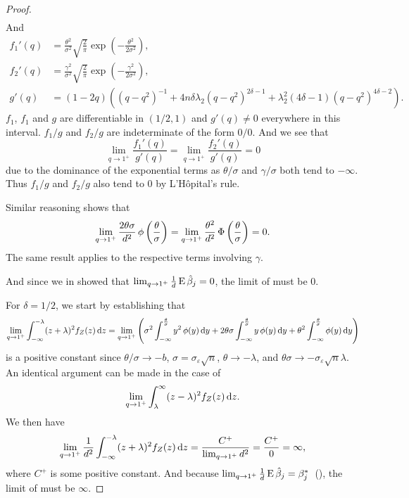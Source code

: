 \begin{proof}
\[\begin{aligned}
    \end{aligned}
  \]
  And
  \begin{align*}
    f_1'(q) & = \frac{\theta^2}{\sigma^2}\sqrt{\frac{2}{\pi}}\exp\left(-\frac{\theta^2}{2\sigma^2}\right),                                    \\
    f_2'(q) & = \frac{\gamma^2}{\sigma^2}\sqrt{\frac{2}{\pi}}\exp\left(-\frac{\gamma^2}{2\sigma^2}\right),                                    \\
    g'(q)   & = (1-2q)\left((q-q^2)^{-1} + 4n\delta \lambda_2 (q-q^2)^{2\delta - 1} + \lambda_2^2 (4 \delta - 1)(q-q^2)^{4\delta - 2}\right).
  \end{align*}
  \(f_1\), \(f_1\) and \(g\) are differentiable in \((1/2, 1)\) and \(g'(q) \neq 0\) everywhere in this interval. \(f_1/g\) and \(f_2/g\) are indeterminate of the form \(0/0\). And we see that
  \[
    \lim_{q \rightarrow 1^+} \frac{f_1'(q)}{g'(q)} = \lim_{q \rightarrow 1^+} \frac{f_2'(q)}{g'(q)} = 0
  \]
  due to the dominance of the exponential terms as \(\theta/\sigma\) and \(\gamma/\sigma\) both tend to \(-\infty\). Thus \(f_1/g\) and \(f_2/g\) also tend to 0 by L'Hôpital's rule.

  Similar reasoning shows that
  \[
    \lim_{q \rightarrow 1^+} \frac{2\theta \sigma}{d^2} \operatorname{\phi} \left(\frac{\theta}{\sigma}\right) = \lim_{q \rightarrow 1^+} \frac{\theta^2}{d^2} \operatorname{\Phi} \left(\frac{\theta}{\sigma}\right) = 0.
  \]
  The same result applies to the respective terms involving \(\gamma\).

  And since we in  showed that \(\lim_{q\rightarrow 1^+} \frac{1}{d} \operatorname{E} \hat{\beta}_j = 0\), the limit of  must be 0.

  For \(\delta = 1/2\), we start by establishing that
  \[
    \lim_{q \rightarrow 1^+} \int_{-\infty}^{-\lambda}(z+ \lambda)^2 f_Z(z) \mathop{}\!\mathrm{d} z = \lim_{q \rightarrow 1^+} \left(\sigma^2 \int_{-\infty}^\frac{\theta}{\sigma} y^2 \operatorname{\phi}(y) \mathop{}\!\mathrm{d} y + 2 \theta \sigma \int_{-\infty}^\frac{\theta}{\sigma} y \operatorname{\phi}(y) \mathop{}\!\mathrm{d} y + \theta^2 \int_{-\infty}^\frac{\theta}{\sigma} \operatorname{\phi}(y) \mathop{}\!\mathrm{d} y\right)
  \]
  is a positive constant since \(\theta/\sigma \rightarrow -b\), \(\sigma = \sigma_\varepsilon \sqrt{n}\), \(\theta \rightarrow - \lambda\), and \(\theta\sigma \rightarrow - \sigma_\varepsilon \sqrt{n}\lambda\). An identical argument can be made in the case of
  \[
    \lim_{q \rightarrow 1^+} \int_{\lambda}^{\infty}(z - \lambda)^2 f_Z(z) \mathop{}\!\mathrm{d} z.
  \]
  We then have
  \[
    \lim_{q \rightarrow 1^+} \frac{1}{d^2} \int_{-\infty}^{-\lambda}(z+ \lambda)^2 f_Z(z) \mathop{}\!\mathrm{d} z = \frac{C^+}{\lim_{q\rightarrow 1^+} d^2} = \frac{C^+}{0} = \infty,
  \]
  where \(C^+\) is some positive constant.
  And because \(\lim_{q\rightarrow 1^+} \frac{1}{d} \operatorname{E} \hat{\beta}_j = \beta_j^*\)~(), the limit of  must be \(\infty\).


\end{proof}

